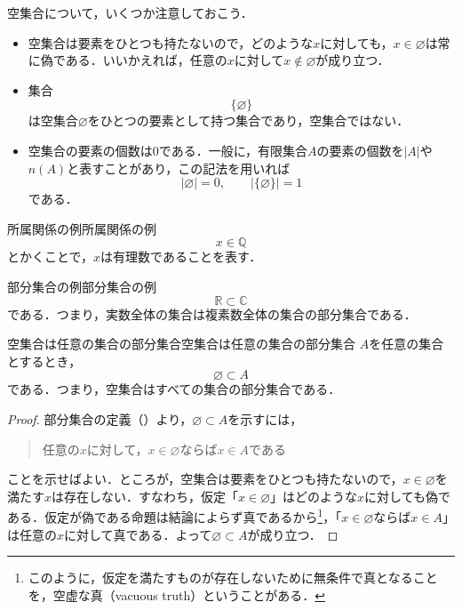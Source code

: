 \begin{remark}[空集合に関する注意]
  空集合について，いくつか注意しておこう．
  \begin{itemize}
    \item 空集合は要素をひとつも持たないので，どのような$x$に対しても，$x \in \varnothing$は常に偽である．いいかえれば，任意の$x$に対して$x \notin \varnothing$が成り立つ．
    \item 集合
          \[
            \{\varnothing\}
          \]
          は空集合$\varnothing$をひとつの要素として持つ集合であり，空集合ではない．
    \item 空集合の要素の個数は$0$である．一般に，有限集合$A$の要素の個数を$|A|$や$n(A)$と表すことがあり，この記法を用いれば
          \[
            |\varnothing| = 0, \qquad |\{\varnothing\}| = 1
          \]
          である．
  \end{itemize}
\end{remark}

\begin{example}{所属関係の例}{所属関係の例}
  \[
    x \in \mathbb{Q}
  \]
  とかくことで，$x$は有理数であることを表す．
\end{example}

\begin{example}{部分集合の例}{部分集合の例}
  \[
    \mathbb{R} \subset \mathbb{C}
  \]
  である．つまり，実数全体の集合は複素数全体の集合の部分集合である．
\end{example}

\begin{prop}{空集合は任意の集合の部分集合}{空集合は任意の集合の部分集合}
  $A$を任意の集合とするとき，
  \[
    \varnothing \subset A
  \]
  である．つまり，空集合はすべての集合の部分集合である．
\end{prop}

\begin{tleftbar}
  \begin{proof}
    部分集合の定義（）より，$\varnothing \subset A$を示すには，
    \begin{quotation}
      任意の$x$に対して，$x \in \varnothing$ならば$x \in A$である
    \end{quotation}
    ことを示せばよい．ところが，空集合は要素をひとつも持たないので，$x \in \varnothing$を満たす$x$は存在しない．すなわち，仮定「$x \in \varnothing$」はどのような$x$に対しても偽である．仮定が偽である命題は結論によらず真であるから\footnote{このように，仮定を満たすものが存在しないために無条件で真となることを，空虚な真（vacuous truth）ということがある．}，「$x \in \varnothing$ならば$x \in A$」は任意の$x$に対して真である．よって$\varnothing \subset A$が成り立つ．
  \end{proof}
\end{tleftbar}

